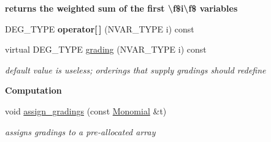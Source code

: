 \begin{Indent}\textbf{ returns the weighted sum of the first \textbackslash{}f\$i\textbackslash{}f\$ variables}\par
\begin{DoxyCompactItemize}
\item 
\mbox{\label{class_w_grevlex___order___data_a91af5dd81fbb141ab08be35acbd001a1}} 
D\+E\+G\+\_\+\+T\+Y\+PE {\bfseries operator\mbox{[}$\,$\mbox{]}} (N\+V\+A\+R\+\_\+\+T\+Y\+PE i) const
\item 
\mbox{\label{class_w_grevlex___order___data_a8c40a4e5b4859c6ffe0060419f81cea5}} 
virtual D\+E\+G\+\_\+\+T\+Y\+PE \hyperlink{class_w_grevlex___order___data_a8c40a4e5b4859c6ffe0060419f81cea5}{grading} (N\+V\+A\+R\+\_\+\+T\+Y\+PE i) const
\begin{DoxyCompactList}\small\item\em default value is useless; orderings that supply gradings should redefine \end{DoxyCompactList}\end{DoxyCompactItemize}
\end{Indent}
\begin{Indent}\textbf{ Computation}\par
\begin{DoxyCompactItemize}
\item 
void \hyperlink{class_w_grevlex___order___data_a43f37e1e5c272de1cd51afdde79727ae}{assign\+\_\+gradings} (const \hyperlink{class_monomial}{Monomial} \&t)
\begin{DoxyCompactList}\small\item\em assigns gradings to a pre-\/allocated array \end{DoxyCompactList}\end{DoxyCompactItemize}
\end{Indent}
